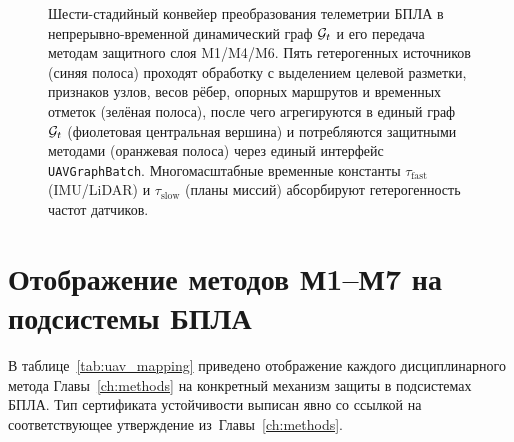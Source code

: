 \begin{figure}[H]
\caption{Шести-стадийный конвейер преобразования телеметрии БПЛА в
непрерывно-временной динамический граф $\mathcal{G}_t$ и его передача
методам защитного слоя \textsf{M1}/\textsf{M4}/\textsf{M6}. Пять
гетерогенных источников (синяя полоса) проходят обработку с
выделением целевой разметки, признаков узлов, весов рёбер, опорных
маршрутов и временных отметок (зелёная полоса), после чего
агрегируются в единый граф $\mathcal{G}_t$ (фиолетовая центральная
вершина) и потребляются защитными методами (оранжевая полоса)
через единый интерфейс \texttt{UAVGraphBatch}.
Многомасштабные временные константы $\tau_{\mathrm{fast}}$
(IMU/LiDAR) и $\tau_{\mathrm{slow}}$ (планы миссий) абсорбируют
гетерогенность частот датчиков.}
\label{fig:uav_telemetry_pipeline}
\end{figure}


\section{Отображение методов \textsf{М1}--\textsf{М7} на подсистемы БПЛА}
\label{sec:uav_mapping}

В таблице~\ref{tab:uav_mapping} приведено отображение каждого
дисциплинарного метода Главы~\ref{ch:methods} на конкретный механизм
защиты в подсистемах БПЛА. Тип сертификата устойчивости выписан явно
со ссылкой на соответствующее утверждение из~Главы~\ref{ch:methods}.

